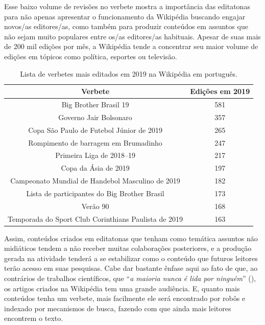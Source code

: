Esse baixo volume de revisões no verbete mostra a importância das editatonas para não apenas apresentar o funcionamento da Wikipédia buscando engajar novos/as editores/as, como também para produzir conteúdos em assuntos que não sejam muito populares entre os/as editores/as habituais. Apesar de suas mais de 200 mil edições por mês, a Wikipédia tende a concentrar seu maior volume de edições em tópicos como política, esportes ou televisão.

\begin{center}
\begin{table}
\begin{tabular}{ |c|c| } 
 \hline
\textbf{Verbete} & \textbf{Edições em 2019} \\ 
\hline
Big Brother Brasil 19 & 581 \\ 
\hline
Governo Jair Bolsonaro & 357 \\ 
\hline
Copa São Paulo de Futebol Júnior de 2019 & 265 \\ 
\hline
Rompimento de barragem em Brumadinho & 247 \\ 
\hline
Primeira Liga de 2018–19 & 217 \\ 
\hline
Copa da Ásia de 2019 & 197 \\ 
\hline
Campeonato Mundial de Handebol Masculino de 2019 & 182 \\ 
\hline
Lista de participantes do Big Brother Brasil & 173 \\ 
\hline
Verão 90 & 168 \\ 
\hline
Temporada do Sport Club Corinthians Paulista de 2019 & 163 \\ 
 \hline
\end{tabular}
\caption{Lista de verbetes mais editados em 2019 na Wikipédia em português.}
\label{table:verbetes-mais-editados-2019}
\end{table}
\end{center}

Assim, conteúdos criados em editatonas que tenham como temática assuntos não midiáticos tendem a não receber muitas colaborações posteriores, e a produção gerada na atividade tenderá a se estabilizar como o conteúdo que futuros leitores terão acesso em suas pesquisas. Cabe dar bastante ênfase aqui ao fato de que, ao contrários de trabalhos científicos, que ``\textit{a maioria nunca é lida por ninguém}'' (\cite[p.59]{latour_ciencia_1987}), os artigos criados na Wikipédia tem uma grande audiência. E, quanto mais conteúdos tenha um verbete, mais facilmente ele será encontrado por robôs e indexado por mecanismos de busca, fazendo com que ainda mais leitores encontrem o texto.


